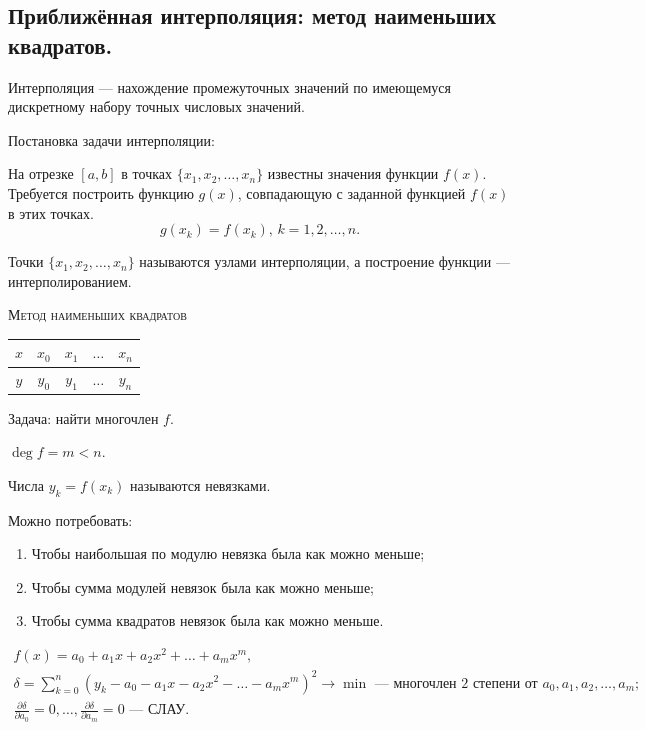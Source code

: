 \subsection{Приближённая интерполяция: метод наименьших квадратов.}

Интерполяция --- нахождение промежуточных значений по имеющемуся дискретному набору точных числовых значений. 

Постановка задачи интерполяции:

На отрезке $[a, b]$ в точках $\{x_1, x_2, \dotsc, x_n\}$ известны значения функции $f(x)$. Требуется построить функцию $g(x)$, совпадающую с заданной функцией $f(x)$ в этих точках.
\begin{equation*}
	g(x_k) = f(x_k), \, k = 1, 2, \dotsc, n.
\end{equation*}

Точки $\{x_1, x_2, \dotsc, x_n\}$ называются узлами интерполяции, а построение функции --- интерполированием. 

\textsc{Метод наименьших квадратов}

\begin{table}[H]
	\centering
	\begin{tabular}{|c|c|c|c|c|}
		\hline
		{$x$} & {$x_0$} & {$x_1$} & {$\dotsc$} & {$x_n$} \\ \hline 
		{$y$} & {$y_0$} & {$y_1$} & {$\dotsc$} & {$y_n$} \\ \hline 
	\end{tabular}
\end{table}

Задача: найти многочлен $f$.

$\deg{f} = m < n$.

Числа $y_k = f(x_k)$ называются невязками. 

Можно потребовать:
\begin{enumerate}
	\item Чтобы наибольшая по модулю невязка была как можно меньше;
	
	\item Чтобы сумма модулей невязок была как можно меньше;
	
	\item Чтобы сумма квадратов невязок была как можно меньше.
\end{enumerate}
\begin{gather*}
	f(x) = a_0 + a_1 x + a_2 x^2 + \dotsc + a_m x^m, \\
	\delta = \sum\limits_{k = 0}^{n}(y_{k} - a_0 - a_1 x - a_2 x^2 - \dotsc - a_m x^m)^2 \to \min \text{ --- многочлен 2 степени от } a_0, a_1, a_2, \dotsc, a_m; \\
	\frac{\partial \delta}{\partial a_0} = 0, \dotsc, \frac{\partial \delta}{\partial a_m} = 0 \text{ --- СЛАУ}.
\end{gather*}

